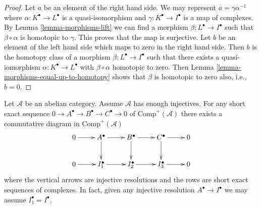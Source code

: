 \begin{proof}
Let $a$ be an element of the right hand side.
We may represent $a = \gamma\alpha^{-1}$ where
$\alpha : K^\bullet \to L^\bullet$
is a quasi-isomorphism and $\gamma : K^\bullet \to I^\bullet$ is a map
of complexes. By
Lemma \ref{lemma-morphisms-lift}
we can find a morphism $\beta : L^\bullet \to I^\bullet$ such that
$\beta \circ \alpha$ is homotopic to $\gamma$. This proves that the
map is surjective. Let $b$ be an element of the left hand side
which maps to zero in the right hand side. Then $b$ is the homotopy class
of a morphism $\beta : L^\bullet \to I^\bullet$ such that there exists a
quasi-iomorphism $\alpha : K^\bullet \to L^\bullet$ with
$\beta  \circ \alpha$ homotopic to zero. Then
Lemma \ref{lemma-morphisms-equal-up-to-homotopy}
shows that $\beta$ is homotopic to zero also, i.e., $b = 0$.
\end{proof}

\begin{lemma}
\label{lemma-injective-resolution-ses}
Let $\mathcal{A}$ be an abelian category.
Assume $\mathcal{A}$ has enough injectives.
For any short exact sequence
$0 \to A^\bullet \to B^\bullet \to C^\bullet \to 0$
of $\text{Comp}^{+}(\mathcal{A})$ there exists a
commutative diagram in $\text{Comp}^{+}(\mathcal{A})$
$$
\xymatrix{
0 \ar[r] &
A^\bullet \ar[r] \ar[d] &
B^\bullet \ar[r] \ar[d] &
C^\bullet \ar[r] \ar[d] &
0 \\
0 \ar[r] &
I_1^\bullet \ar[r] &
I_2^\bullet \ar[r] &
I_3^\bullet \ar[r] &
0
}
$$
where the vertical arrows are injective resolutions and
the rows are short exact sequences of complexes.
In fact, given any injective resolution $A^\bullet \to I^\bullet$
we may assume $I_1^\bullet = I^\bullet$.
\end{lemma}

